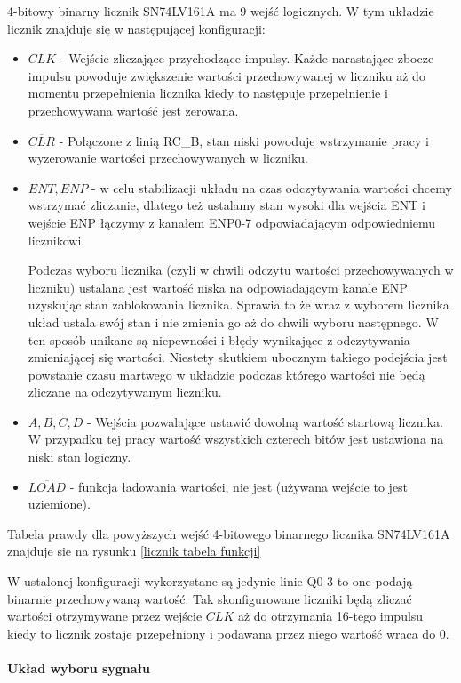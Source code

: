 4-bitowy binarny licznik SN74LV161A ma 9 wejść logicznych. 
W tym układzie licznik znajduje się w następującej konfiguracji:
\begin{itemize}
        \item $CLK$ - Wejście zliczające przychodzące impulsy. Każde narastające zbocze impulsu powoduje zwiększenie wartości przechowywanej w liczniku aż do momentu przepełnienia licznika kiedy to następuje przepełnienie i przechowywana wartość jest zerowana.  
        \item $\overline{CLR}$ - Połączone z linią RC\_B, stan niski powoduje wstrzymanie pracy i wyzerowanie wartości przechowywanych w liczniku. 
        \item $ENT,ENP$ - w celu stabilizacji układu na czas odczytywania wartości chcemy wstrzymać zliczanie, dlatego też ustalamy stan wysoki dla wejścia ENT i wejście ENP łączymy z kanałem ENP0-7 odpowiadającym odpowiedniemu licznikowi.
        
        Podczas wyboru licznika (czyli w chwili odczytu wartości przechowywanych w liczniku) ustalana jest wartość niska na odpowiadającym kanale ENP uzyskując stan zablokowania licznika. 
        Sprawia to że wraz z wyborem licznika układ ustala swój stan i nie zmienia go aż do chwili wyboru następnego. 
        W ten sposób unikane są niepewności i błędy wynikające z odczytywania zmieniającej się wartości. Niestety skutkiem ubocznym takiego podejścia jest powstanie czasu martwego w układzie podczas którego wartości nie będą zliczane na odczytywanym liczniku.
        \item $A,B,C,D$ - Wejścia pozwalające ustawić dowolną wartość startową licznika. W przypadku tej pracy wartość wszystkich czterech bitów jest ustawiona na niski stan logiczny.
        \item $\overline{LOAD}$ - funkcja ładowania wartości, nie jest (używana wejście to jest uziemione).
\end{itemize} 
Tabela prawdy dla powyższych wejść 4-bitowego binarnego licznika SN74LV161A znajduje sie na rysunku \ref{licznik tabela funkcji}

W ustalonej konfiguracji wykorzystane są jedynie linie Q0-3 to one podają binarnie przechowywaną wartość. 
Tak skonfigurowane liczniki będą zliczać wartości otrzymywane przez wejście $CLK$ aż do otrzymania 16-tego impulsu kiedy to licznik zostaje przepełniony i podawana przez niego wartość wraca do 0. 

\paragraph{Układ wyboru sygnału}

